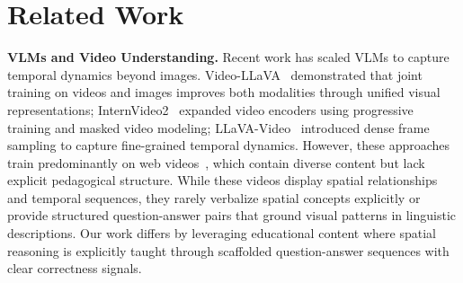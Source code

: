\documentclass{article}
\newcommand{\com}[1]{\textcolor{red}{#1}}
\begin{document}

\section{Related Work}

\textbf{VLMs and Video Understanding.}
Recent work has scaled VLMs to capture temporal dynamics beyond images. Video-LLaVA~\cite{lin2024videollava} demonstrated that joint training on videos and images improves both modalities through unified visual representations; InternVideo2~\cite{wang2024internvideo2} expanded video encoders using progressive training and masked video modeling; LLaVA-Video~\cite{zhang2024llavavideo} introduced dense frame sampling to capture fine-grained temporal dynamics. However, these approaches train predominantly on web videos~\cite{miech2019howto100m, abu2016youtube, kay2017kinetics}, which contain diverse content but lack explicit pedagogical structure. While these videos display spatial relationships and temporal sequences, they rarely verbalize spatial concepts explicitly or provide structured question-answer pairs that ground visual patterns in linguistic descriptions. Our work differs by leveraging educational content where spatial reasoning is explicitly taught through scaffolded question-answer sequences with clear correctness signals.
\end{document}
